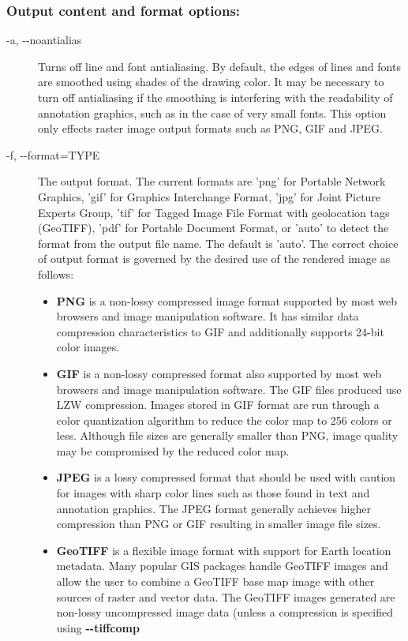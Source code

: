 \subsubsection*{Output content and format options:}
\begin{description}
\item[-a, -{-}noantialias]Turns off line and font antialiasing. By default, the edges of lines and fonts are smoothed using shades of the drawing color. It may be necessary to turn off antialiasing if the smoothing is interfering with the readability of annotation graphics, such as in the case of very small fonts. This option only effects raster image output formats such as PNG, GIF and JPEG.
\item[-f, -{-}format=TYPE]The output format. The current formats are 'png' for Portable Network Graphics, 'gif' for Graphics Interchange Format, 'jpg' for Joint Picture Experts Group, 'tif' for Tagged Image File Format with geolocation tags (GeoTIFF), 'pdf' for Portable Document Format, or 'auto' to detect the format from the output file name. The default is 'auto'. The correct choice of output format is governed by the desired use of the rendered image as follows: \begin{itemize}
\item \textbf{PNG}
 is a non-lossy compressed image format supported by most web browsers and image manipulation software. It has similar data compression characteristics to GIF and additionally supports 24-bit color images. 
\item \textbf{GIF}
 is a non-lossy compressed format also supported by most web browsers and image manipulation software. The GIF files produced use LZW compression. Images stored in GIF format are run through a color quantization algorithm to reduce the color map to 256 colors or less. Although file sizes are generally smaller than PNG, image quality may be compromised by the reduced color map.
\item \textbf{JPEG}
 is a lossy compressed format that should be used with caution for images with sharp color lines such as those found in text and annotation graphics. The JPEG format generally achieves higher compression than PNG or GIF resulting in smaller image file sizes. 
\item \textbf{GeoTIFF}
 is a flexible image format with support for Earth location metadata. Many popular GIS packages handle GeoTIFF images and allow the user to combine a GeoTIFF base map image with other sources of raster and vector data. The GeoTIFF images generated are non-lossy uncompressed image data (unless a compression is specified using \textbf{-{-}tiffcomp}

\end{itemize}
\end{description}
